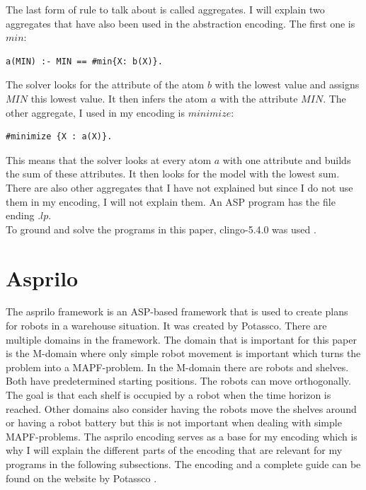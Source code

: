 \documentclass[runningheads]{llncs}
\begin{document}
The last form of rule to talk about is called aggregates. I will explain two aggregates that have also been used in the abstraction encoding. The first one is $min$:
\begin{verbatim}
a(MIN) :- MIN == #min{X: b(X)}.
\end{verbatim}
The solver looks for the attribute of the atom $b$ with the lowest value and assigns  $MIN$ this lowest value. It then infers the atom $a$ with the attribute $MIN$. The other aggregate, I used in my encoding is $minimize$:
\begin{verbatim}
#minimize {X : a(X)}.
\end{verbatim}
This means that the solver looks at every atom $a$ with one attribute and builds the sum of these attributes. It then looks for the model with the lowest sum. \\
There are also other aggregates that I have not explained but since I do not use them in my encoding, I will not explain them. An ASP program has the file ending $.lp$.\\
To ground and solve the programs in this paper, clingo-5.4.0 was used \cite{clingo}. 



\section{Asprilo}
The asprilo framework is an ASP-based framework that is used to create plans for robots in a warehouse situation. It was created by Potassco. There are multiple domains in the framework. The domain that is important for this paper is the M-domain where only simple robot movement is important which turns the problem into a MAPF-problem. In the M-domain there are robots and shelves. Both have predetermined starting positions. The robots can move orthogonally. The goal is that each shelf is occupied by a robot when the time horizon is reached. Other domains also consider having the robots move the shelves around or having a robot battery but this is not important when dealing with simple MAPF-problems. The asprilo encoding serves as a base for my encoding which is why I will explain the different parts of the encoding that are relevant for my programs in the following subsections. The encoding and a complete guide can be found on the website by Potassco \cite{asprilo}.
\end{document}
